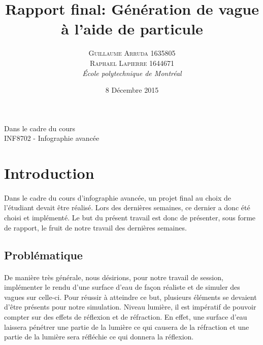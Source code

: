 \documentclass[a4paper, 12pt]{article} %
\title{Rapport final: Génération de vague à l'aide de particule}
\author{\textsc{Guillaume Arruda 1635805\\Raphael Lapierre 1644671} %
\vspace{10pt}
\\{\textit{École polytechnique de Montréal}}} %
\date{8 Décembre 2015} %
\makeatletter
\renewcommand{\maketitle}{ %
\begin{center} %

\vspace*{25pt} %
{\LARGE\@title} %

\vspace{125pt} %

{\large\@author} %

\vspace{125pt} %
Dans le cadre du cours
\\INF8702 - Infographie avancée
\vspace{125pt} %
\\\@date %
\vspace{125pt} %

\end{center}
}
\makeatother
\begin{document}
\thispagestyle{empty}
\clearpage\maketitle %
\pagebreak[4]
\tableofcontents
\pagebreak[4]

\setlength{\headheight}{15.0pt}
\pagestyle{fancy}
\fancyhead[C]{}

\section{Introduction}
    \paragraph{}
    Dans le cadre du cours d'infographie avancée, un projet final au choix de l'étudiant 
    devait être réalisé. Lors des dernières semaines, ce dernier a donc été choisi et implémenté.
    Le but du présent travail est donc de présenter, sous forme de rapport, le fruit de notre
    travail des dernières semaines.

\subsection{Problématique}
    \paragraph{}
    De manière très générale, nous désirions, pour notre travail de session, implémenter 
    le rendu d'une surface d'eau de façon réaliste et de simuler des vagues sur celle-ci.
    Pour réussir à atteindre ce but, plusieurs éléments se devaient d'être présents pour notre
    simulation. Niveau lumière, il est impératif de pouvoir compter sur des effets de réflexion
    et de réfraction. En effet, une surface d'eau laissera pénétrer une partie de la lumière
    ce qui causera de la réfraction et une partie de la lumière sera réfléchie ce qui donnera
    la réflexion.
\end{document}
